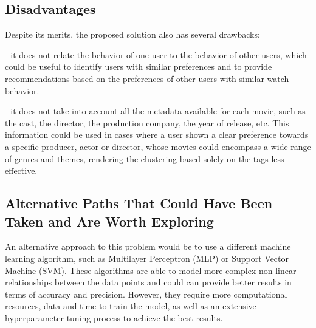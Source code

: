 
\subsection{Disadvantages}

Despite its merits, the proposed solution also has several drawbacks:

- it does not relate the behavior of one user to the behavior of other users, which could be useful to identify users with similar preferences and to provide recommendations based on the preferences of other users with similar watch behavior.

- it does not take into account all the metadata available for each movie, such as the cast, the director, the production company, the year of release, etc. This information could be used in cases where a user shown a clear preference towards a specific producer, actor or director, whose movies could encompass a wide range of genres and themes, rendering the clustering based solely on the tags less effective.



\subsection{Alternative Paths That Could Have Been Taken and Are Worth Exploring}

An alternative approach to this problem would be to use a different machine learning algorithm, such as Multilayer Perceptron (MLP) or Support Vector Machine (SVM). These algorithms are able to model more complex non-linear relationships between the data points and could can provide better results in terms of accuracy and precision. However, they require more computational resources, data and time to train the model, as well as an extensive hyperparameter tuning process to achieve the best results.

